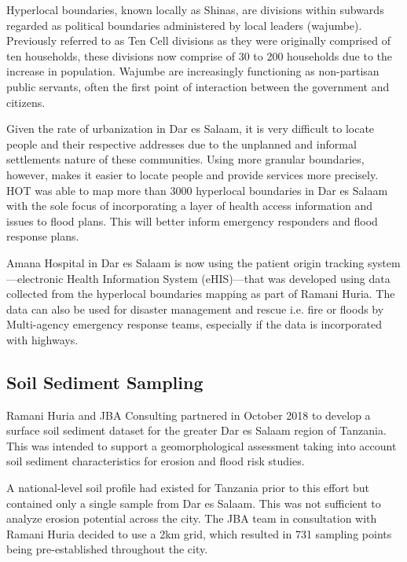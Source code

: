 \documentclass[a4paper,12pt,twoside]{article}
\begin{document}
\begin{multicols}{2}
Hyperlocal boundaries, known locally as Shinas, are divisions within subwards regarded as political boundaries administered by local leaders (wajumbe). Previously referred to as Ten Cell divisions as they were originally comprised of ten households, these divisions now comprise of 30 to 200 households due to the increase in population. Wajumbe are increasingly functioning as non-partisan public servants, often the first point of interaction between the government and citizens.

Given the rate of urbanization in Dar es Salaam, it is very difficult to locate people and their respective addresses due to the unplanned and informal settlements nature of these communities. Using more granular boundaries, however, makes it easier to locate people and provide services more precisely. HOT was able to map more than 3000 hyperlocal boundaries in Dar es Salaam with the sole focus of incorporating a layer of health access information and issues to flood plans. This will better inform emergency responders and flood response plans. 

Amana Hospital in Dar es Salaam is now using the patient origin tracking system---electronic Health Information System (eHIS)---that was developed using data collected from the hyperlocal boundaries mapping as part of Ramani Huria. The data can also be used for disaster management and rescue i.e. fire or floods by Multi-agency emergency response teams, especially if the data is incorporated with highways.
\end{multicols}

\newpage
\subsection{Soil Sediment Sampling}

\begin{multicols}{2}
Ramani Huria and JBA Consulting partnered in October 2018 to develop a surface soil sediment dataset for the greater Dar es Salaam region of Tanzania. This was intended to support a geomorphological assessment taking into account soil sediment characteristics for erosion and flood risk studies.

A national-level soil profile had existed for Tanzania prior to this effort but contained only a single sample from Dar es Salaam. This was not sufficient to analyze erosion potential across the city. The JBA team in consultation with Ramani Huria decided to use a 2km grid, which resulted in 731 sampling points being pre-established throughout the city.
\end{multicols}
\end{document}
